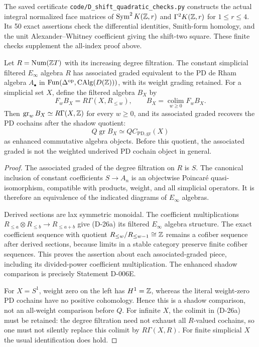 The saved certificate \texttt{code/D\_shift\_quadratic\_checks.py}
constructs the actual integral normalized face matrices of
$\operatorname{Sym}^2K(\mathbb Z,r)$ and $\Gamma^2K(\mathbb Z,r)$ for
$1\le r\le4$. Its 50 exact assertions check the differential
identities, Smith-form homology, and the unit Alexander--Whitney
coefficient giving the shift-two square. These finite checks
supplement the all-index proof above.

\begin{proposition}
\label{sa08:D026}
Let $R=\operatorname{Num}(\mathbb Z T)$ with its increasing degree
filtration. The constant simplicial filtered $E_\infty$ algebra
$R$ has associated graded equivalent to the PD de Rham algebra
$A_\bullet$ in
$\operatorname{Fun}(\Delta^{\mathrm{op}},
\operatorname{CAlg}(D(\mathbb Z)))$, with its weight grading retained.
For a simplicial set $X$, define the filtered algebra $B_X$ by
\[
 F_wB_X=R\Gamma(X,R_{\le w}),\qquad
 B_X=\operatorname*{colim}_{w\ge0}F_wB_X.
 \tag{D-26a}
\]
Then $\operatorname{gr}_wB_X\simeq R\Gamma(X,\mathbb Z)$ for every
$w\ge0$, and its associated graded recovers the PD cochains
after the shadow quotient:
\[
 Q\operatorname{gr}B_X
   \simeq Q C_{\mathrm{PD},\mathrm{gr}}(X)
\]
as enhanced commutative algebra objects. Before this quotient,
the associated graded is not the weighted underived PD cochain
object in general.
\end{proposition}

\begin{proof}
The associated graded of the degree filtration on $R$ is $S$.
The canonical inclusion of constant coefficients
$S\to A_n$ is an objectwise Poincar\'e quasi-isomorphism,
compatible with products, weight, and all simplicial operators.
It is therefore an equivalence of the indicated diagrams of
$E_\infty$ algebras.

Derived sections are lax symmetric monoidal. The coefficient
multiplications $R_{\le a}\otimes R_{\le b}\to R_{\le a+b}$
give (D-26a) its filtered $E_\infty$ algebra structure.
The exact coefficient sequence with quotient
$R_{\le w}/R_{\le w-1}\cong\mathbb Z$ remains a cofiber sequence
after derived sections, because limits in a stable category
preserve finite cofiber sequences. This proves the assertion
about each associated-graded piece, including its
divided-power coefficient multiplication. The enhanced shadow
comparison is precisely Statement D-006E.

For $X=S^1$, weight zero on the left has
$H^1=\mathbb Z$, whereas the literal weight-zero PD cochains have
no positive cohomology. Hence this is a shadow comparison,
not an all-weight comparison before $Q$.
For infinite $X$, the colimit in (D-26a) must be retained:
the degree filtration need not exhaust all $R$-valued
cochains, so one must not silently replace this colimit by
$R\Gamma(X,R)$. For finite simplicial $X$ the usual
identification does hold.
\end{proof}

